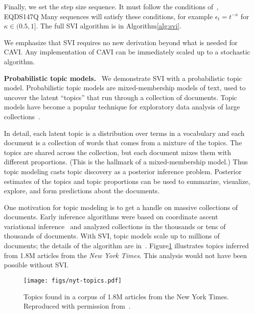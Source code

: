 \documentclass{article}
\DeclareRobustCommand{\parhead}[1]{\textbf{#1}~}
\begin{document}
Finally, we set the step size sequence.  It must follow the conditions
of~\citet{Robbins:1951},
EQDS147Q
Many sequences will satisfy these conditions, for example
$\epsilon_t = t^{-\kappa}$ for $\kappa \in (0.5, 1]$.  The full
\gls{SVI} algorithm is in Algorithm\nobreakspace \ref {alg:svi}.

We emphasize that \gls{SVI} requires no new derivation beyond what is
needed for \gls{CAVI}. Any implementation of \gls{CAVI} can be
immediately scaled up to a stochastic algorithm.

\parhead{Probabilistic topic models.} We demonstrate \gls{SVI} with a
probabilistic topic model.  Probabilistic topic models are
mixed-membership models of text, used to uncover the latent ``topics''
that run through a collection of documents. Topic models have become a
popular technique for exploratory data analysis of large
collections~\citep{Blei:2012}.

In detail, each latent topic is a distribution over terms in a
vocabulary and each document is a collection of words that comes from
a mixture of the topics.  The topics are shared across the collection,
but each document mixes them with different proportions. (This is the
hallmark of a mixed-membership model.)  Thus topic modeling casts
topic discovery as a posterior inference problem. Posterior estimates
of the topics and topic proportions can be used to summarize,
visualize, explore, and form predictions about the documents.

One motivation for topic modeling is to get a handle on massive
collections of documents.  Early inference algorithms were based on
coordinate ascent variational inference~\citep{Blei:2003b} and
analyzed collections in the thousands or tens of thousands of
documents.  With \gls{SVI}, topic models scale up to millions of
documents; the details of the algorithm are in~\citet{Hoffman:2013}.
Figure\nobreakspace \ref {fig:nyt} illustrates topics inferred from 1.8M articles from the
\textit{New York Times}.  This analysis would not have been possible
without \gls{SVI}.

\begin{figure}[t]
  \centering
    \texttt{[image: figs/nyt-topics.pdf]}
  \caption{\label{fig:nyt} Topics found in a corpus of 1.8M
    articles from the New York Times.  Reproduced with permission
    from~\citet{Hoffman:2013}.}
\end{figure}
\end{document}
